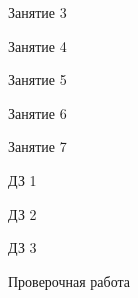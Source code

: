 \begin{class}[number=3]
	\begin{listofex}
		\item Занятие 3
	\end{listofex}
\end{class}

\begin{class}[number=4]
	\begin{listofex}
		\item Занятие 4
	\end{listofex}
\end{class}

\begin{class}[number=5]
	\begin{listofex}
		\item Занятие 5
	\end{listofex}
\end{class}

\begin{class}[number=6]
	\begin{listofex}
		\item Занятие 6
	\end{listofex}
\end{class}

\begin{class}[number=7]
	\begin{listofex}
		\item Занятие 7
	\end{listofex}
\end{class}

\begin{homework}[number=1]
	\begin{listofex}
		\item ДЗ 1
	\end{listofex}
\end{homework}

\begin{homework}[number=2]
	\begin{listofex}
		\item ДЗ 2
	\end{listofex}
\end{homework}

\begin{homework}[number=3]
	\begin{listofex}
		\item ДЗ 3
	\end{listofex}
\end{homework}

\begin{exam}
	\begin{listofex}
		\item Проверочная работа
	\end{listofex}
\end{exam}
